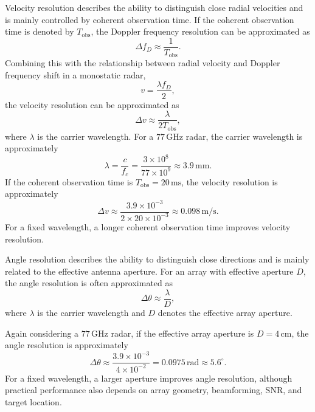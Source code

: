 Velocity resolution describes the ability to distinguish close radial
velocities and is mainly controlled by coherent observation time.
If the coherent observation time is denoted by \(T_{\mathrm{obs}}\), the
Doppler frequency resolution can be approximated as
\begin{equation}
    \Delta f_D \approx \frac{1}{T_{\mathrm{obs}}}.
    \label{eq:doppler_frequency_resolution}
\end{equation}
Combining this with the relationship between radial velocity and Doppler
frequency shift in a monostatic radar,
\begin{equation}
    v=\frac{\lambda f_D}{2},
    \label{eq:velocity_doppler_resolution}
\end{equation}
the velocity resolution can be approximated as
\begin{equation}
    \Delta v \approx \frac{\lambda}{2T_{\mathrm{obs}}},
    \label{eq:velocity_resolution}
\end{equation}
where \(\lambda\) is the carrier wavelength.
For a \(77\,\mathrm{GHz}\) radar, the carrier wavelength is approximately
\begin{equation}
    \lambda=\frac{c}{f_c}
    =
    \frac{3\times10^8}{77\times10^9}
    \approx 3.9\,\mathrm{mm}.
    \label{eq:wavelength_77ghz}
\end{equation}
If the coherent observation time is \(T_{\mathrm{obs}}=20\,\mathrm{ms}\), the
velocity resolution is approximately
\begin{equation}
    \Delta v
    \approx
    \frac{3.9\times10^{-3}}{2\times20\times10^{-3}}
    \approx
    0.098\,\mathrm{m/s}.
    \label{eq:velocity_resolution_example}
\end{equation}
For a fixed wavelength, a longer coherent observation time improves velocity
resolution.

Angle resolution describes the ability to distinguish close directions and is
mainly related to the effective antenna aperture.
For an array with effective aperture \(D\), the angle resolution is often
approximated as
\begin{equation}
    \Delta \theta \approx \frac{\lambda}{D},
    \label{eq:angle_resolution}
\end{equation}
where \(\lambda\) is the carrier wavelength and \(D\) denotes the effective
array aperture.

Again considering a \(77\,\mathrm{GHz}\) radar, if the effective array aperture
is \(D=4\,\mathrm{cm}\), the angle resolution is approximately
\begin{equation}
    \Delta \theta
    \approx
    \frac{3.9\times10^{-3}}{4\times10^{-2}}
    =
    0.0975\,\mathrm{rad}
    \approx
    5.6^\circ.
    \label{eq:angle_resolution_example}
\end{equation}
For a fixed wavelength, a larger aperture improves angle resolution, although
practical performance also depends on array geometry, beamforming, SNR, and
target location.


